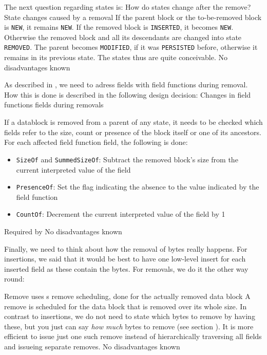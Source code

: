 The next question regarding states is: How do states change after the remove?
{%
State changes caused by a removal
}
{%
If the parent block or the to-be-removed block is \texttt{NEW}, it remains \texttt{NEW}. If the removed block is \texttt{INSERTED}, it becomes \texttt{NEW}. Otherwise the removed block and all its descendants are changed into state \texttt{REMOVED}. The parent becomes \texttt{MODIFIED}, if it was \texttt{PERSISTED} before, otherwise it remains in its previous state.
}
{%
The states thus are quite conceivable.
}
{%
No disadvantages known
}

As described in , we need to adress fields with field functions during removal. How this is done is described in the following design decision:
{%
Changes in field functions fields during removals
}
{%
  If a datablock is removed from a parent of any state, it needs to be checked which fields refer to the size, count or presence of the block itself or one of its ancestors. For each affected field function field, the following is done:
  \begin{itemize}
  \item \texttt{SizeOf} and \texttt{SummedSizeOf}: Subtract the removed block's size from the current interpreted value of the field
  \item \texttt{PresenceOf}: Set the flag indicating the absence to the value indicated by the field function
  \item \texttt{CountOf}: Decrement the current interpreted value of the field by 1
  \end{itemize}
}
{%
Required by 
}
{%
No disadvantages known
}

Finally, we need to think about how the removal of bytes really happens. For insertions, we said that it would be best to have one low-level \COMPmedia{} insert for each inserted field as these contain the bytes. For removals, we do it the other way round:

{%
Remove uses \COMPmedia{}s remove scheduling, done for the actually removed data block
}
{%
A remove is scheduled for the data block that is removed over its whole size.
}
{%
In contrast to insertions, we do not need to state which bytes to remove by having these, but you just can say \emph{how much} bytes to remove (see section ). It is more efficient to issue just one such remove instead of hierarchically traversing all fields and issueing separate removes. 
}
{%
No disadvantages known
}

